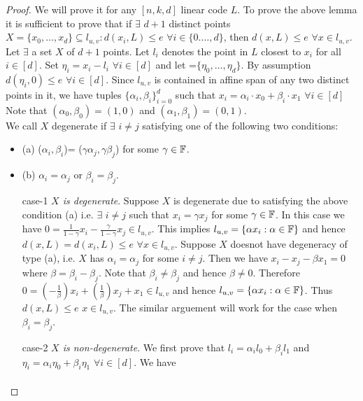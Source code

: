  \begin{proof}
 	We will prove it for any $[n,k,d]$ linear code $L$. To prove the above lemma it is sufficient to prove that if $\exists$ $d+1$ distinct points $X=\{x_0,\ldots, x_{d}\}\subseteq l_{u,v} : d(x_i,L)\leq e$ $\forall i\in \{0.\ldots, d\}$, then $d(x,L)\leq e$ $\forall x\in l_{u,v}$.\\
 	Let $\exists$ a set $X$ of $d+1$ points. Let $l_i$ denotes the point in $L$ closest to $x_i$ for all $i\in [d]$. Set $\eta_i=x_i-l_i$ $\forall i \in [d]$ and let \boldm{$\eta$}=$\{\eta_0,\ldots, \eta_d\}$. By assumption $d(\eta_i,0)\leq e$ $\forall i \in [d]$. Since $l_{u,v}$ is contained in affine span of any two distinct points in it, we have tuples $\{\alpha_i, \beta_i\}_{i=0}^{d}$ such that $x_i= \alpha_i\cdot x_0+\beta_i\cdot x_1$ $\forall i\in [d]$ Note that $(\alpha_0,\beta_0)=(1,0)$ and $(\alpha_1, \beta_1)= (0,1)$.\\
 	We call $X$ degenerate if $\exists$ $i\neq j$ satisfying one of the following two conditions:
 	\begin{itemize}
 		\item(a) ($\alpha_i,\beta_i$)= ($\gamma\alpha_j,\gamma\beta_j$) for some $\gamma\in {\mathbb F}$.
 		\item(b) $\alpha_i=\alpha_j$ or $\beta_i=\beta_j$.
 	\end{itemize}
 	\begin{itemize}
 		\item[case-1] \textit{$X$ is degenerate}. Suppose $X$ is degenerate due to satisfying the above condition (a) i.e. $\exists$ $i\neq j$ such that $x_i=\gamma x_j$ for some $\gamma\in {\mathbb F}$. In this case we have $0=\frac{1}{1-\gamma}x_i-\frac{\gamma}{1-\gamma}x_j\in l_{u,v}$. This implies $l_{u,v}=\{\alpha x_i:\alpha\in {\mathbb F}\}$ and hence $d(x,L)=d(x_i,L)\leq e$ $\forall x\in l_{u,v}$. Suppose $X$ doesnot have degeneracy of type (a), i.e. $X$ has $\alpha_i=\alpha_j$ for some $i\neq j$. Then we have $x_i-x_j-\beta x_1=0$ where $\beta=\beta_i-\beta_j$. Note that $\beta_i\neq \beta_j$ and hence $\beta\neq 0$. Therefore $0=(-\frac{1}{\beta})x_i+(\frac{1}{\beta})x_j+x_1\in l_{u,v}$ and hence $l_{u,v}=\{\alpha x_i:\alpha\in {\mathbb F}\}$. Thus $d(x,L)\leq e$ $x\in l_{u,v}$. The similar arguement will work for the case when $\beta_i=\beta_j$.
 		\item[case-2] \textit{$X$ is non-degenerate}. We first prove that $l_i=\alpha_i l_0+\beta_i l_1$ and $\eta_i = \alpha_i \eta_0 + \beta_i \eta_1$ $\forall i\in [d]$. We have 
 		\begin{align*}

\end{align*}
\end{itemize}
\end{proof}
